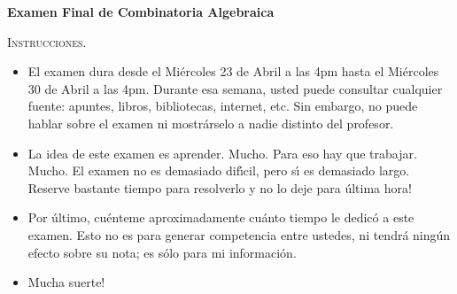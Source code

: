 \documentclass[letterpaper,10pt]{article}
\begin{document}
\begin{center}
{\bf {\Large{Examen Final de Combinatoria Algebraica}}}\\
\medskip
\medskip
\medskip
\end{center}
\large

\begin{center}
\textsc{Instrucciones.}
\end{center}

\begin{itemize}
 \item El examen dura desde el
Mi{\'e}rcoles 23 de Abril a las 4pm hasta el Mi{\'e}rcoles 30 de
Abril a las 4pm. Durante esa semana, usted puede consultar
cualquier fuente: apuntes, libros, bibliotecas, internet, etc. Sin
embargo, no puede hablar sobre el examen ni mostr{\'a}rselo a
nadie distinto del profesor.

\item La idea de este examen es aprender. Mucho. Para eso hay que
trabajar. Mucho. El examen no es demasiado dif{\'\i}cil, pero
s{\'\i} es demasiado largo. Reserve bastante tiempo para
resolverlo y no lo deje para {\'u}ltima hora!

\item Por {\'u}ltimo, cu{\'e}nteme aproximadamente cu{\'a}nto
tiempo le dedic{\'o} a este examen. Esto no es para generar
competencia entre ustedes, ni tendr{\'a} ning{\'u}n efecto sobre
su nota; es s{\'o}lo para mi informaci{\'o}n.

\item Mucha suerte!

\end{itemize}



\medskip

\end{document}
